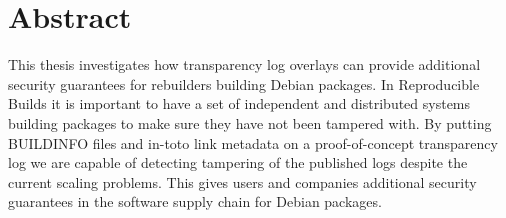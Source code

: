 \documentclass[../Main/thesis.tex]{subfiles}
\begin{document}
{}
\chapter*{Abstract}
This thesis investigates how transparency log overlays can provide additional
security guarantees for rebuilders building Debian packages. In Reproducible
Builds it is important to have a set of independent and distributed systems
building packages to make sure they have not been tampered with. By putting
BUILDINFO files and in-toto link metadata on a proof-of-concept transparency log
we are capable of detecting tampering of the published logs despite the current
scaling problems. This gives users and companies additional security guarantees
in the software supply chain for Debian packages.
\vfill\vfill
\blankpage
\end{document}
